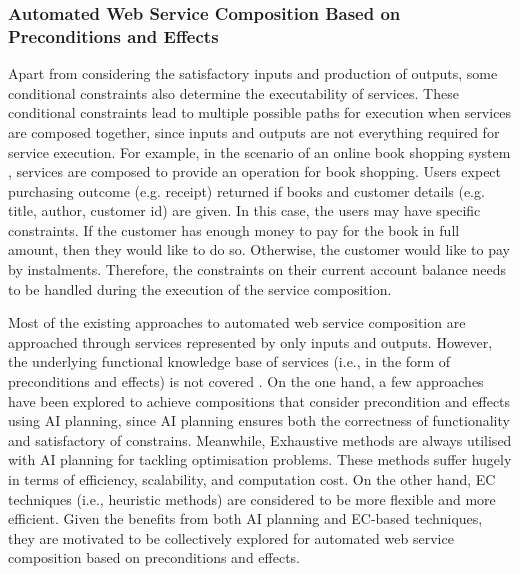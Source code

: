 \subsubsection{Automated Web Service Composition Based on Preconditions and Effects}
Apart from considering the satisfactory inputs and production of outputs, some conditional constraints also determine the executability of services.  These conditional constraints lead to multiple possible paths for execution when services are composed together, since inputs and outputs are not everything required for service execution. For example, in the scenario of an online book shopping system \cite{wang2014automated}, services are composed to provide an operation for book shopping.  Users expect purchasing outcome (e.g. receipt) returned if books and customer details (e.g. title, author, customer id) are given. In this case, the users may have specific constraints. If the customer has enough money to pay for the book in full amount, then they would like to do so. Otherwise, the customer would like to pay by instalments. Therefore, the constraints on their current account balance needs to be handled during the execution of the service composition.

Most of the existing approaches to automated web service composition are approached through services represented by only inputs and outputs. However, the underlying functional knowledge base of services (i.e., in the form of preconditions and effects) is not covered \cite{paliwal2012semantics}. On the one hand, a few approaches \cite{bansal2016generalized,DBLP:journals/soca/BoustilMS14} have been explored to achieve compositions that consider precondition and effects using AI planning, since AI planning ensures both the correctness of functionality and satisfactory of constrains. Meanwhile, Exhaustive methods are always utilised with AI planning for tackling optimisation problems. These methods suffer hugely in terms of efficiency, scalability, and computation cost. On the other hand, EC techniques (i.e., heuristic methods) are considered to be more flexible and more efficient. Given the benefits from both AI planning and EC-based techniques, they are motivated to be collectively explored for automated web service composition based on preconditions and effects.
 
